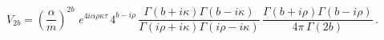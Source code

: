 \begin{equation}\label{V(k,k)1}
V_{2b}=\left(\frac{\alpha}{m}\right)^{2b}\,\,e^{4i\alpha\rho\kappa\tau}\,4^{b-i\rho}\,
\frac{\Gamma\left(b+i\kappa\right)
\Gamma\left(b-i\kappa\right)}
{\Gamma\left(i\rho+i\kappa\right)
\Gamma\left(i\rho-i\kappa\right)}\,\frac
{\Gamma\left(b+i\rho\right)
\Gamma\left(b-i\rho\right)}{4\pi\,\Gamma(2b)}\,.
\end{equation}

